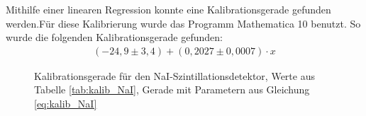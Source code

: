 \documentclass[
	parskip=half,10pt,
	numbers= noenddot, %
	toc=flat, %
	oneside,
	twocolumn,
	]{scrartcl}
\begin{document}

Mithilfe einer linearen Regression konnte eine Kalibrationsgerade gefunden werden.Für diese Kalibrierung wurde das Programm Mathematica 10 benutzt. 
So wurde die folgenden Kalibrationsgerade gefunden:
\begin{align}
(-24,9 \pm 3,4) + (0,2027 \pm 0,0007) \cdot x
\label{eq:kalib_NaI}
\end{align}


\begin{figure}[h!]
\begin{center}
\end{center} 
\caption{Kalibrationsgerade für den NaI-Szintillationsdetektor, Werte aus Tabelle \ref{tab:kalib_NaI}, Gerade mit Parametern aus Gleichung \ref{eq:kalib_NaI}}
\label{fig:Kalibrationsgerade_NaI}
\end{figure}
\end{document}
